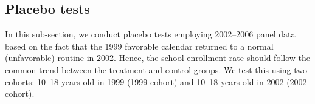\documentclass[12pt,letterpaper]{article}
\newcommand{\0}{\ensuremath{\mbox{\boldmath $0$}}}
\begin{document}
\subsection{Placebo tests}

In this sub-section, we conduct placebo tests employing 2002–2006 panel data based on the fact that the 1999 favorable calendar returned to a normal (unfavorable) routine in 2002. Hence, the school enrollment rate should follow the common trend between the treatment and control groups. We test this using two cohorts: 10–18 years old in 1999 (1999 cohort) and 10–18 years old in 2002 (2002 cohort).

\end{document}
